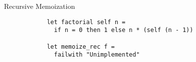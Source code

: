\documentclass{beamer}
\begin{document}
    \begin{frame}[fragile=singleslide]{Recursive Memoization}
        \begin{verbatim}
            let factorial self n =
              if n = 0 then 1 else n * (self (n - 1))

            let memoize_rec f =
              failwith "Unimplemented"
        \end{verbatim} 
    \end{frame}
\end{document}
